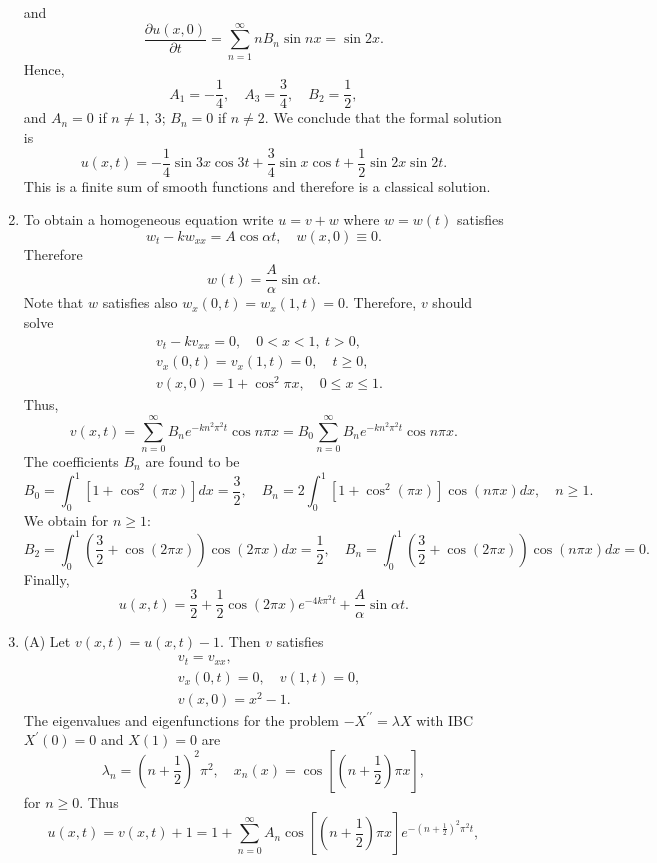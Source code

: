 \documentclass[11pt,a4paper]{article}
\begin{document}
\begin{enumerate}
$$		$$
		and
		$$
		\frac{\partial u(x, 0)}{\partial t} = \sum_{n = 1}^\infty nB_n\sin nx = \sin 2x.
		$$
		Hence,
		$$
		A_1 = -\frac{1}{4},\quad A_3 = \frac{3}{4},\quad B_2 = \frac{1}{2},
		$$
		and $A_n = 0$ if $n \neq 1,\ 3$; $B_n = 0$ if $n \neq 2$. We conclude that the formal solution is
		$$
		u(x, t) = -\frac{1}{4}\sin 3x\cos 3t + \frac{3}{4}\sin x\cos t + \frac{1}{2}\sin 2x\sin 2t.
		$$
		This is a finite sum of smooth functions and therefore is a classical solution.
		\item To obtain a homogeneous equation write $u = v + w$ where $w = w(t)$ satisfies
		$$
		w_t - kw_{xx} = A\cos \alpha t,\quad w(x, 0) \equiv 0.
		$$
		Therefore
		$$
		w(t) = \frac{A}{\alpha}\sin \alpha t.
		$$
		Note that $w$ satisfies also $w_x(0, t) = w_x(1, t) = 0$. Therefore, $v$ should solve
		\begin{align*}
			& v_t - kv_{xx} = 0,\quad 0 < x < 1,\ t > 0,\\
			& v_x(0, t) = v_x(1, t) = 0,\quad t\geq 0,\\
			& v(x, 0) = 1 + \cos^2\pi x,\quad 0 \leq x \leq 1.
		\end{align*}
		Thus,
		$$
		v(x, t) = \sum_{n = 0}^\infty B_ne^{-kn^2\pi^2t}\cos n\pi x = B_0\sum_{n = 0}^\infty B_ne^{-kn^2\pi^2t}\cos n\pi x.
		$$
		The coefficients $B_n$ are found to be
		$$
		B_0 = \int_0^1 [1 + \cos^2(\pi x)]dx = \frac{3}{2},\quad B_n = 2\int_0^1 [1 + \cos^2(\pi x)] \cos(n\pi x)dx,\quad n\geq 1.
		$$
		We obtain for $n \geq 1$:
		$$
		B_2 = \int_0^1\left(\frac{3}{2} + \cos(2\pi x)\right)\cos(2\pi x)dx = \frac{1}{2},\quad B_n = \int_0^1 \left(\frac{3}{2} + \cos(2\pi x)\right)\cos(n\pi x)dx = 0.
		$$
		Finally,
		$$
		u(x, t) = \frac{3}{2} + \frac{1}{2}\cos(2\pi x)e^{-4k\pi^2t} + \frac{A}{\alpha}\sin\alpha t.
		$$
		\item (A) Let $v(x, t) = u(x, t) - 1$. Then $v$ satisfies
		\begin{align*}
			& v_t = v_{xx},\\
			& v_x(0, t) = 0,\quad v(1, t) = 0,\\
			& v(x, 0) = x^2 - 1.
		\end{align*}
		The eigenvalues and eigenfunctions for the problem $-X^{\prime\prime} = \lambda X$ with IBC $X^\prime (0) = 0$ and $X(1) = 0$ are
		$$
		\lambda_n = \left(n + \frac{1}{2}\right)^2\pi^2,\quad x_n(x) = \cos\left[\left(n + \frac{1}{2}\right)\pi x\right],
		$$
		for $n \geq 0$. Thus
		$$
		u(x, t) = v(x, t) + 1 = 1 + \sum_{n = 0}^\infty A_n\cos\left[\left(n + \frac{1}{2}\right)\pi x\right]e^{-\left(n + \frac{1}{2}\right)^2\pi^2t},
$$
\end{enumerate}
\end{document}
